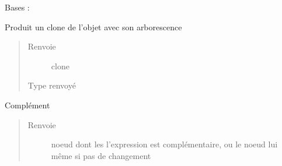 \documentclass[letterpaper,10pt,french]{sphinxmanual}
\begin{document}
\begin{fulllineitems}
\label{\detokenize{logicexpressionnodes:logicexpressionnodes.AndNode}}
Bases : {\hyperref[\detokenize{logicexpressionnodes:logicexpressionnodes.LogicExpressionNode}]{}}

\begin{fulllineitems}
\label{\detokenize{logicexpressionnodes:logicexpressionnodes.AndNode.clone}}
Produit un clone de l’objet avec son arborescence
\begin{quote}\begin{description}
\item[{Renvoie}] \leavevmode
clone

\item[{Type renvoyé}] \leavevmode
{\hyperref[\detokenize{logicexpressionnodes:logicexpressionnodes.LogicExpressionNode}]{}}

\end{description}\end{quote}

\end{fulllineitems}


\begin{fulllineitems}
\label{\detokenize{logicexpressionnodes:logicexpressionnodes.AndNode.logicNegateClone}}
Complément
\begin{quote}\begin{description}
\item[{Renvoie}] \leavevmode
noeud dont les l’expression est complémentaire, ou le noeud lui même si pas de changement


\end{description}
\end{quote}
\end{fulllineitems}
\end{fulllineitems}
\end{document}
